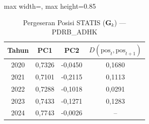 \begin{table}[H]
\centering
\caption{Pergeseran Posisi STATIS ($\mathbf{G}_k$) --- PDRB_ADHK} \label{tab:app2jarak_statis_loading_pdrb_adhk}
\begin{adjustbox}{max width=\textwidth, max height=0.85\textheight}
\begin{tabular}{|c|c|c|c|}
\hline
\textbf{Tahun} & \textbf{PC1} & \textbf{PC2} & \textbf{$D(\text{pos}_t, \text{pos}_{t+1})$} \\
\hline
2020 & 0,7326 & -0,0450 & 0,1680 \\
2021 & 0,7101 & -0,2115 & 0,1113 \\
2022 & 0,7288 & -0,1018 & 0,0291 \\
2023 & 0,7433 & -0,1271 & 0,1283 \\
2024 & 0,7743 & -0,0026 & -- \\
\hline
\end{tabular}
\end{adjustbox}
\end{table}